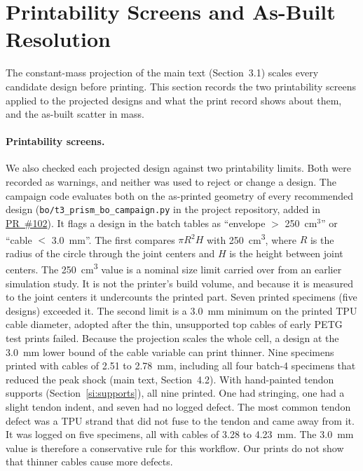 \documentclass[11pt]{article}
\newcommand{\repo}{https://github.com/vertical-cloud-lab/tensegrity-optimization}
\begin{document}
\section{Printability Screens and As-Built Resolution}
\label{si:printability}
The constant-mass projection of the main text (Section~3.1) scales every
candidate design before printing. This section records the two printability
screens applied to the projected designs and what the print record shows
about them, and the as-built scatter in mass.

\paragraph{Printability screens.} We also checked each projected design against two printability
limits. Both were recorded as warnings, and neither was used to reject
or change a design. The campaign code evaluates both on the as-printed
geometry of every recommended design
(\texttt{bo/\allowbreak t3\_prism\_bo\_campaign.py} in the project
repository, added in \href{\repo/pull/102}{PR~\#102}). It flags a design in the batch tables
as ``envelope ${>}$ 250~cm$^3$'' or ``cable ${<}$ 3.0~mm''. The first compares $\pi R^2 H$ with
\SI{250}{cm^3}, where $R$ is the radius of the circle through the
joint centers and $H$ is the height between joint centers. The
\SI{250}{cm^3} value is a nominal size limit carried over from an
earlier simulation study. It is not the printer's build volume, and
because it is measured to the joint centers it undercounts the printed
part. Seven printed specimens (five designs) exceeded it. The second
limit is a \SI{3.0}{mm} minimum on the printed TPU cable diameter,
adopted after the thin, unsupported top cables of early PETG test
prints failed. Because the projection scales the whole cell, a
design at the \SI{3.0}{mm} lower bound of the cable variable can print
thinner. Nine specimens printed with cables of 2.51 to \SI{2.78}{mm},
including all four batch-4 specimens that reduced the peak shock
(main text, Section~4.2). With hand-painted tendon supports
(Section~\ref{si:supports}), all nine printed. One had
stringing, one had a slight tendon indent, and seven had no logged
defect. The most common tendon defect was a TPU strand that did not
fuse to the tendon and came away from it. It was logged on five
specimens, all with cables of 3.28 to \SI{4.23}{mm}. The \SI{3.0}{mm}
value is therefore a conservative rule for this workflow. Our prints
do not show that thinner cables cause more defects.
\end{document}

